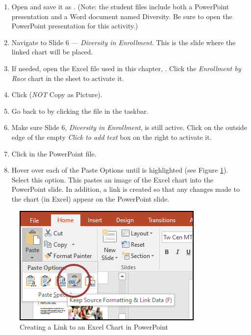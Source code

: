 \begin{enumerate}
	\item Open  and save it as . (Note: the student files include both a PowerPoint presentation and a Word document named Diversity. Be sure to open the PowerPoint presentation for this activity.) 
	\item Navigate to Slide $ 6 $ --- \textit{Diversity in Enrollment}. This is the slide where the linked chart will be placed.
	\item If needed, open the Excel file used in this chapter, . Click the \textit{Enrollment by Race} chart in the  sheet to activate it.
	\item Click  (\textit{NOT} Copy as Picture).
	\item Go back to  by clicking the file in the taskbar.
	\item Make sure Slide 6, \textit{Diversity in Enrollment}, is still active. Click on the outside edge of the empty \textit{Click to add text} box on the right to activate it.
	\item Click  in the PowerPoint file.
	\item Hover over each of the Paste Options until  is highlighted (see Figure \ref{04:fig49}). Select this option. This pastes an image of the Excel chart into the PowerPoint slide. In addition, a link is created so that any changes made to the chart (in Excel) appear on the PowerPoint slide.
\end{enumerate}

\begin{figure}[H]
	\centering
	\includegraphics[width=\maxwidth{.75\linewidth}]{gfx/ch04_fig49}
	\caption{Creating a Link to an Excel Chart in PowerPoint}
	\label{04:fig49}
\end{figure}

